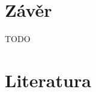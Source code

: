 \documentclass[12pt]{article}
\begin{document}
\section{Závěr}

%

TODO

\section{Literatura}

\appendix
\end{document}
